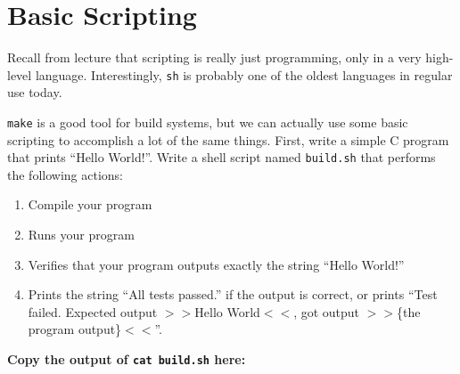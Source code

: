 \documentclass{article}
\begin{document}
\newpage
\section{Basic Scripting}

Recall from lecture that scripting is really just programming, only in a very
high-level language. Interestingly, \texttt{sh} is probably one of the oldest
languages in regular use today.

\texttt{make} is a good tool for build systems, but we can actually use some
basic scripting to accomplish a lot of the same things.
First, write a simple C program that prints ``Hello World!''.
Write a shell script named \texttt{build.sh} that performs the following
actions:
\begin{enumerate}
  \item Compile your program
  \item Runs your program
  \item Verifies that your program outputs exactly the string ``Hello World!''
  \item Prints the string ``All tests passed.'' if the output is correct, or
    prints ``Test failed. Expected output $>>$Hello World$<<$, got
    output $>>$\{the program output\}$<<$''.
\end{enumerate}

\textbf{Copy the output of \texttt{cat build.sh} here:}
\end{document}
